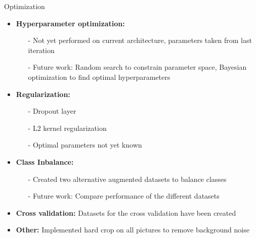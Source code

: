 \begin{frame}{\huge{Optimization}}
  \begin{itemize}
    \item \textbf{Hyperparameter optimization:}
    \begin{itemize}
      \item[-] Not yet performed on current architecture, parameters taken from last iteration
      \item[-] Future work: Random search to constrain parameter space, Bayesian optimization to find optimal hyperparameters
    \end{itemize}
    \item \textbf{Regularization:}
    \begin{itemize}
      \item[-] Dropout layer
      \item[-] L2 kernel regularization
      \item[-] Optimal parameters not yet known
    \end{itemize}
    \item \textbf{Class Inbalance:}
      \begin{itemize}
        \item[-] Created two alternative augmented datasets to balance classes
        \item[-] Future work: Compare performance of the different datasets
      \end{itemize}
    \item \textbf{Cross validation:} Datasets for the cross validation have been created
    \item \textbf{Other:} Implemented hard crop on all pictures to remove background noise
  \end{itemize}
\end{frame}

